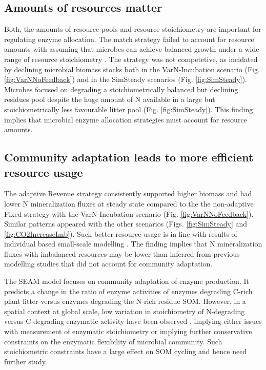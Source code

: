 \subsection{Amounts of resources matter}
Both, the amounts of resource pools and resource stoichiometry are important for
regulating enzyme allocation. The match strategy failed to account for resource
amounts with assuming that microbes can achieve balanced growth under a wide
range of resource stoichiometry \citep{Moorhead12, Ballantyne14}. The strategy
was not competetive, as incidated by declining microbial biomass stocks both in
the VarN-Incubation scenario (Fig. \ref{fig:VarNNoFeedback}) and in the
SimSteady scenarios (Fig. \ref{fig:SimSteady}). Microbes focused on degrading a
stoichiometrically balanced but declining residues pool despite the huge amount
of N available in a large but stoichiometrically less favourable litter pool
(Fig. \ref{fig:SimSteady}). This finding implies that microbial enzyme
allocation strategies must account for resource amounts.

\subsection{Community adaptation leads to more efficient resource usage}
The adaptive Revenue strategy consistently supported higher biomass and had
lower N mineralization fluxes at steady state compared to the the non-adaptive
Fixed strategy with the VarN-Incubation scenario (Fig.
\ref{fig:VarNNoFeedback}). Similar patterns appeared with the other scenarios
(Figs. \ref{fig:SimSteady} and \ref{fig:CO2IncreaseImb}). Such better resource
usage is in line with results of individual based small-scale modelling
\citep{Kaiser14}.
The finding implies that N mineralization fluxes with imbalanced resources may
be lower than inferred from previous modelling studies that did not account for
community adaptation.

The SEAM model focuses on community adaptation of enzyme production. It predicts
a change in the ratio of enzyme activities of enzymes degrading C-rich plant
litter versus enzymes degrading the N-rich residue SOM.
However, in a spatial context at global scale, low variation in stoichiometry
of N-degrading versus C-degrading enzymatic activity have been observed
\citep{Sinsabaugh09}, implying either issues with measurement of enzymatic
stoichiometry or implying further conservative constraints on the enzymatic
flexibility of microbial community.
Such stoichiometric constraints have a large effect on SOM cycling and hence
need further study.

